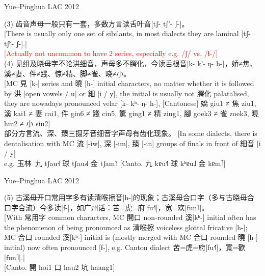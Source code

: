 \documentclass{beamer}
\begin{document}
\begin{frame}[fragile]{Yue–Pinghua \scriptsize{LAC 2012}}

{\small
(3) 齿音声母一般只有一套，多数方言读舌叶音[tʃ- tʃ'- ʃ-]。\\
{\scriptsize[There is usually only one set of sibilants, in most dialects they are laminal [tʃ- tʃʰ- ʃ-].]\\
\smallskip
\textcolor{red}{[Actually not uncommon to have 2 series, especially e.g. /ʃ/ vs. /ɬ-/]}
}\\
\medskip
(4) 见组及晓母字不论洪细音，声母多不腭化，今读舌根音[k- k'- ŋ- h-]，娇≠焦、溪≠妻、件≠践、惊≠精、脚≠雀、晓≠小。\\
{\scriptsize[MC 見 [k-] series and 曉 [h-] initial characters, no matter whether it is followed by 洪 [open vowels / u] or 細 [i / y], the initial is usually not 腭化 palatalised, they are nowadays pronounced velar [k- kʰ- ŋ- h-], [Cantonese] 嬌 giu1 ≠ 焦 ziu1, 溪 kai1 ≠ 妻 cai1, 件 gin6 ≠ 踐 cin5, 驚 ging1 ≠ 精 zing1, 腳 goek3 ≠ 雀 zoek3, 曉 hiu2 ≠ 小 siu2]}\\
\smallskip
部分方言流、深、臻三摄牙音细音字声母有齿化现象。
{\scriptsize[In some dialects, there is dentalisation with MC 流 [-iw], 深 [-im], 臻 [-in] groups of finals in front of 細音 [i / y]}\\
e.g. 玉林\ 九 tʃau˧ 球 tʃau˩˧˩ 金 tʃam˥˦ {\scriptsize[Canto. 九 kɐu˧˥ 球 kʰɐu˩ 金 kɐm˥]}
}
\end{frame}

\begin{frame}[fragile]{Yue–Pinghua \scriptsize{LAC 2012}}

{\small
(5) 古溪母开口常用字多有读清喉擦音[h-]的现象；古溪母合口字（多与古晓母合口字合流）今多读[f-]，如广州话：苦=虎=府[fu˧˥]，宽=欢[fun˥]。\\
{\scriptsize[With 常用字 common characters, MC 開口 non-rounded 溪[kʰ-] initial often has the phenomenon of being pronounced as 清喉擦 voiceless glottal fricative [h-]; MC 合口 rounded 溪[kʰ-] initial is (mostly merged with MC 合口 rounded 曉 [h-] initial) now often pronounced [f-], e.g. Canton dialect 苦=虎=府[fu˧˥]，寬=歡[fun˥].]}\\
\medskip
{[Canto. 開 hoi1 口 hau2 坑 haang1]}\\
}
\end{frame}
\end{document}
